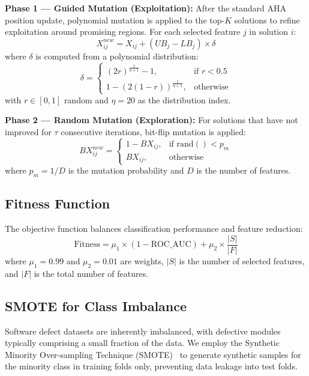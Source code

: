 \documentclass[conference,twocolumn]{IEEEtran}
\begin{document}
\textbf{Phase 1 --- Guided Mutation (Exploitation):} After the standard AHA position update, polynomial mutation is applied to the top-$K$ solutions to refine exploitation around promising regions. For each selected feature $j$ in solution $i$:
\begin{equation}
X_{ij}^{new} = X_{ij} + (UB_j - LB_j) \times \delta
\label{eq:guided_mut}
\end{equation}
where $\delta$ is computed from a polynomial distribution:
\begin{equation}
\delta = \begin{cases}
(2r)^{\frac{1}{\eta+1}} - 1, & \text{if } r < 0.5 \\
1 - (2(1-r))^{\frac{1}{\eta+1}}, & \text{otherwise}
\end{cases}
\label{eq:polynomial}
\end{equation}
with $r \in [0,1]$ random and $\eta = 20$ as the distribution index.

\textbf{Phase 2 --- Random Mutation (Exploration):} For solutions that have not improved for $\tau$ consecutive iterations, bit-flip mutation is applied:
\begin{equation}
BX_{ij}^{new} = \begin{cases} 1 - BX_{ij}, & \text{if } \text{rand}() < p_m \\ BX_{ij}, & \text{otherwise} \end{cases}
\label{eq:bitflip}
\end{equation}
where $p_m = 1/D$ is the mutation probability and $D$ is the number of features.

\subsection{Fitness Function}

The objective function balances classification performance and feature reduction:
\begin{equation}
\text{Fitness} = \mu_1 \times (1 - \text{ROC\_AUC}) + \mu_2 \times \frac{|S|}{|F|}
\label{eq:fitness}
\end{equation}
where $\mu_1 = 0.99$ and $\mu_2 = 0.01$ are weights, $|S|$ is the number of selected features, and $|F|$ is the total number of features.

\subsection{SMOTE for Class Imbalance}

Software defect datasets are inherently imbalanced, with defective modules typically comprising a small fraction of the data. We employ the Synthetic Minority Over-sampling Technique (SMOTE)~\cite{chawla2002smote} to generate synthetic samples for the minority class in training folds only, preventing data leakage into test folds.
\end{document}

